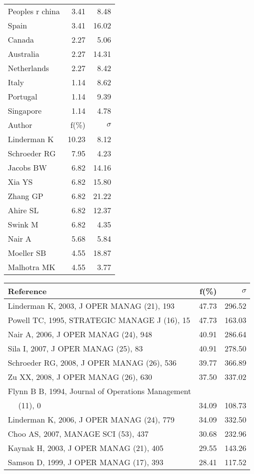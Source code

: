 \documentclass[a4paper,11pt]{report}
\begin{document}
\begin{landscape}
\begin{table}[!ht]
{\begin{tabular}{|l r r|}
Peoples r china & 3.41 & 8.48\\
Spain & 3.41 & 16.02\\
Canada & 2.27 & 5.06\\
Australia & 2.27 & 14.31\\
Netherlands & 2.27 & 8.42\\
Italy & 1.14 & 8.62\\
Portugal & 1.14 & 9.39\\
Singapore & 1.14 & 4.78\\
\hline
\hline
Author & f(\%) & $\sigma$\\
\hline
Linderman K & 10.23 & 8.12\\
Schroeder RG & 7.95 & 4.23\\
Jacobs BW & 6.82 & 14.16\\
Xia YS & 6.82 & 15.80\\
Zhang GP & 6.82 & 21.22\\
Ahire SL & 6.82 & 12.37\\
Swink M & 6.82 & 4.35\\
Nair A & 5.68 & 5.84\\
Moeller SB & 4.55 & 18.87\\
Malhotra MK & 4.55 & 3.77\\
\hline
\end{tabular}
}
{\scriptsize\begin{tabular}{|l r r|}
\hline
Reference & f(\%) & $\sigma$\\
\hline
Linderman K, 2003, J OPER MANAG (21), 193 & 47.73 & 296.52\\
Powell TC, 1995, STRATEGIC MANAGE J (16), 15 & 47.73 & 163.03\\
Nair A, 2006, J OPER MANAG (24), 948 & 40.91 & 286.64\\
Sila I, 2007, J OPER MANAG (25), 83 & 40.91 & 278.50\\
Schroeder RG, 2008, J OPER MANAG (26), 536 & 39.77 & 366.89\\
Zu XX, 2008, J OPER MANAG (26), 630 & 37.50 & 337.02\\
Flynn B B, 1994, Journal of Operations Management &  & \\
$\quad$ (11), 0 & 34.09 & 108.73\\
Linderman K, 2006, J OPER MANAG (24), 779 & 34.09 & 332.50\\
Choo AS, 2007, MANAGE SCI (53), 437 & 30.68 & 232.96\\
Kaynak H, 2003, J OPER MANAG (21), 405 & 29.55 & 143.26\\
Samson D, 1999, J OPER MANAG (17), 393 & 28.41 & 117.52\\

\end{tabular}}
\end{table}
\end{landscape}
\end{document}
